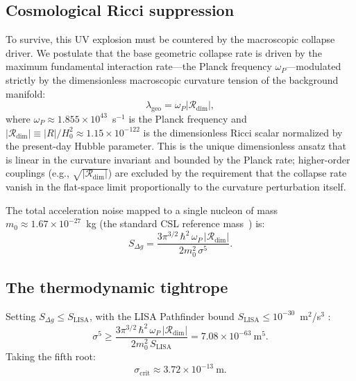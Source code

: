 \documentclass[aps,prd,twocolumn,superscriptaddress,nofootinbib]{revtex4-2}
\theoremstyle{definition}
\theoremstyle{remark}
\newcommand{\Rdim}{\mathcal{R}_{\mathrm{dim}}}
\newcommand{\sigcrit}{\sigma_{\mathrm{crit}}}
\newcommand{\lambdageo}{\lambda_{\mathrm{geo}}}
\newcommand{\omegaP}{\omega_P}
\begin{document}
\subsection{Cosmological Ricci suppression}

To survive, this UV explosion must be countered by the macroscopic
collapse driver. We postulate that the base geometric collapse rate is
driven by the maximum fundamental interaction rate---the Planck frequency
$\omegaP$---modulated strictly by the dimensionless macroscopic curvature
tension of the background manifold:
\begin{equation}
\lambdageo = \omegaP |\Rdim|,
\label{eq:lambda_geo}
\end{equation}
where $\omegaP \approx 1.855 \times 10^{43}$~s$^{-1}$ is the Planck
frequency and $|\Rdim| \equiv |R|/H_0^2 \approx 1.15 \times 10^{-122}$
is the dimensionless Ricci scalar normalized by the present-day Hubble
parameter. This is the unique dimensionless ansatz that is linear in the
curvature invariant and bounded by the Planck rate; higher-order couplings
(e.g., $\sqrt{|\Rdim|}$) are excluded by the requirement that the collapse
rate vanish in the flat-space limit proportionally to the curvature
perturbation itself.

The total acceleration noise mapped to a single nucleon of mass
$m_0 \approx 1.67 \times 10^{-27}$~kg (the standard CSL reference
mass~\cite{Adler2007}) is:
\begin{equation}
S_{\Delta g} = \frac{3\pi^{3/2}\, \hbar^2\, \omegaP\, |\Rdim|}
{2 m_0^2\, \sigma^5}.
\label{eq:acceleration_noise}
\end{equation}

\subsection{The thermodynamic tightrope}

Setting $S_{\Delta g} \leq S_{\mathrm{LISA}}$, with the LISA Pathfinder
bound $S_{\mathrm{LISA}} \leq 10^{-30}$~m$^2$/s$^3$
\cite{LISAPathfinder2016}:
\begin{equation}
\sigma^5 \geq \frac{3\pi^{3/2}\, \hbar^2\, \omegaP\, |\Rdim|}
{2 m_0^2\, S_{\mathrm{LISA}}}
= 7.08 \times 10^{-63}~\text{m}^5.
\label{eq:sigma5_bound}
\end{equation}
Taking the fifth root:
\begin{equation}
\boxed{
\sigcrit \approx 3.72 \times 10^{-13}~\text{m}.
}
\label{eq:sigma_critical}
\end{equation}
\end{document}
